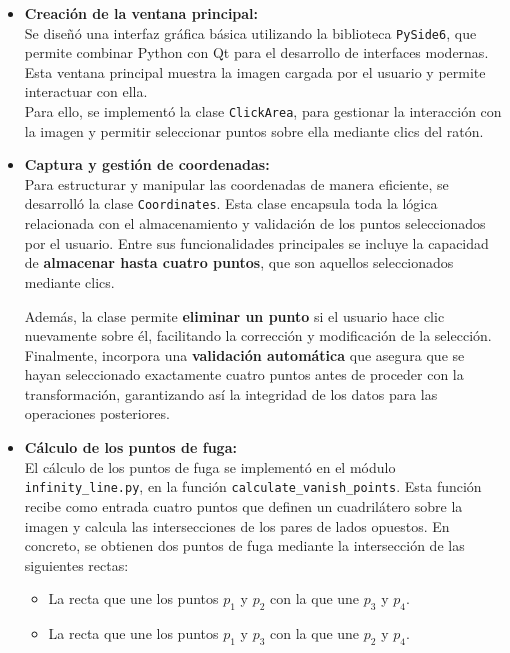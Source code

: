 \begin{itemize}
    \item \textbf{Creación de la ventana principal:} \\
    Se diseñó una interfaz gráfica básica utilizando la biblioteca \texttt{PySide6}, que permite combinar Python con Qt para el desarrollo de interfaces modernas. Esta ventana principal muestra la imagen cargada por el usuario y permite interactuar con ella. \\
    Para ello, se implementó la clase \texttt{ClickArea}, para gestionar la interacción con la imagen y permitir seleccionar puntos sobre ella mediante clics del ratón.
    
    \item \textbf{Captura y gestión de coordenadas:} \\
    Para estructurar y manipular las coordenadas de manera eficiente, se desarrolló la clase \texttt{Coordinates}. Esta clase encapsula toda la lógica relacionada con el almacenamiento y validación de los puntos seleccionados por el usuario. Entre sus funcionalidades principales se incluye la capacidad de \textbf{almacenar hasta cuatro puntos}, que son aquellos seleccionados mediante clics.
    
    Además, la clase permite \textbf{eliminar un punto} si el usuario hace clic nuevamente sobre él, facilitando la corrección y modificación de la selección. Finalmente, incorpora una \textbf{validación automática} que asegura que se hayan seleccionado exactamente cuatro puntos antes de proceder con la transformación, garantizando así la integridad de los datos para las operaciones posteriores.
    
    
    \item \textbf{Cálculo de los puntos de fuga:} \\
    El cálculo de los puntos de fuga se implementó en el módulo \texttt{infinity\_line.py}, en la función \texttt{calculate\_vanish\_points}. Esta función recibe como entrada cuatro puntos que definen un cuadrilátero sobre la imagen y calcula las intersecciones de los pares de lados opuestos. En concreto, se obtienen dos puntos de fuga mediante la intersección de las siguientes rectas:
    
    \begin{itemize}
        \item La recta que une los puntos $p_1$ y $p_2$ con la que une $p_3$ y $p_4$.
        \item La recta que une los puntos $p_1$ y $p_3$ con la que une $p_2$ y $p_4$.
    \end{itemize}
    

\end{itemize}
